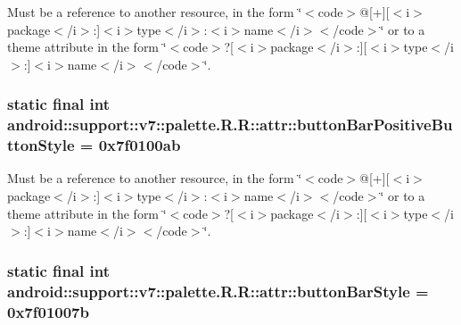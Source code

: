 Must be a reference to another resource, in the form \char`\"{}$<$code$>$@\mbox{[}+\mbox{]}\mbox{[}$<$i$>$package$<$/i$>$:\mbox{]}$<$i$>$type$<$/i$>$:$<$i$>$name$<$/i$>$$<$/code$>$\char`\"{} or to a theme attribute in the form \char`\"{}$<$code$>$?\mbox{[}$<$i$>$package$<$/i$>$:\mbox{]}\mbox{[}$<$i$>$type$<$/i$>$:\mbox{]}$<$i$>$name$<$/i$>$$<$/code$>$\char`\"{}. \hypertarget{classandroid_1_1support_1_1v7_1_1palette_1_1_r_1_1attr_9c0e14af53227ab688c3d267587a372b}{
\subsubsection[{buttonBarPositiveButtonStyle}]{\setlength{\rightskip}{0pt plus 5cm}static final int android::support::v7::palette.R.R::attr::buttonBarPositiveButtonStyle = 0x7f0100ab}}
\label{classandroid_1_1support_1_1v7_1_1palette_1_1_r_1_1attr_9c0e14af53227ab688c3d267587a372b}


Must be a reference to another resource, in the form \char`\"{}$<$code$>$@\mbox{[}+\mbox{]}\mbox{[}$<$i$>$package$<$/i$>$:\mbox{]}$<$i$>$type$<$/i$>$:$<$i$>$name$<$/i$>$$<$/code$>$\char`\"{} or to a theme attribute in the form \char`\"{}$<$code$>$?\mbox{[}$<$i$>$package$<$/i$>$:\mbox{]}\mbox{[}$<$i$>$type$<$/i$>$:\mbox{]}$<$i$>$name$<$/i$>$$<$/code$>$\char`\"{}. \hypertarget{classandroid_1_1support_1_1v7_1_1palette_1_1_r_1_1attr_413682a76a40805f758cad6351f8d211}{
\subsubsection[{buttonBarStyle}]{\setlength{\rightskip}{0pt plus 5cm}static final int android::support::v7::palette.R.R::attr::buttonBarStyle = 0x7f01007b}}
\label{classandroid_1_1support_1_1v7_1_1palette_1_1_r_1_1attr_413682a76a40805f758cad6351f8d211}


